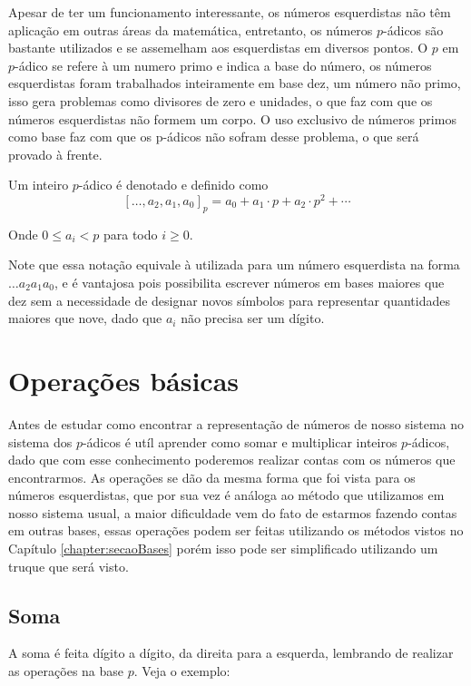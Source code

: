 \documentclass{report}
\newcommand*{\padc}[2]{\left[#1\right]_{#2}}
\theoremstyle{definition}
\begin{document}
Apesar de ter um funcionamento interessante, os números esquerdistas não têm aplicação em outras áreas da matemática, entretanto, os números $p$-ádicos são bastante utilizados e se assemelham aos esquerdistas em diversos pontos. O $p$ em $p$-ádico se refere à um numero primo e indica a base do número, os números esquerdistas foram trabalhados inteiramente em base dez, um número não primo, isso gera problemas como divisores de zero e unidades, o que faz com que os números esquerdistas não formem um corpo. O uso exclusivo de números primos como base faz com que os p-ádicos não sofram desse problema, o que será provado à frente.

Um inteiro $p$-ádico é denotado e definido como
\begin{equation}
    \padc{\ldots, a_2, a_1, a_0}{p} = a_0 + a_1 \cdot p + a_2 \cdot p^2 + \cdots
\end{equation}

Onde $0 \leq a_i < p$ para todo $i \geq 0$.

Note que essa notação equivale à utilizada para um número esquerdista na forma $\ldots a_2 a_1 a_0$, e é vantajosa pois possibilita escrever números em bases maiores que dez sem a necessidade de designar novos símbolos para representar quantidades maiores que nove, dado que $a_i$ não precisa ser um dígito.

\section{Operações básicas} %

Antes de estudar como encontrar a representação de números de nosso sistema no sistema dos $p$-ádicos é utíl aprender como somar e multiplicar inteiros $p$-ádicos, dado que com esse conhecimento poderemos realizar contas com os números que encontrarmos. As operações se dão da mesma forma que foi vista para os números esquerdistas, que por sua vez é análoga ao método que utilizamos em nosso sistema usual, a maior dificuldade vem do fato de estarmos fazendo contas em outras bases, essas operações podem ser feitas utilizando os métodos vistos no Capítulo \ref{chapter:secaoBases} porém isso pode ser simplificado utilizando um truque que será visto.

\subsection{Soma} %

A soma é feita dígito a dígito, da direita para a esquerda, lembrando de realizar as operações na base $p$. Veja o exemplo:
\end{document}
